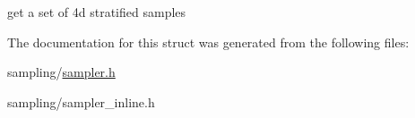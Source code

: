 \label{structnih_1_1_m_j_sampler_a4c2fc9b264a9f2de35125d51e4e19fe4}
get a set of 4d stratified samples 

\-The documentation for this struct was generated from the following files\-:\begin{DoxyCompactItemize}
\item 
sampling/\hyperlink{sampler_8h}{sampler.\-h}\item 
sampling/sampler\-\_\-inline.\-h\end{DoxyCompactItemize}
